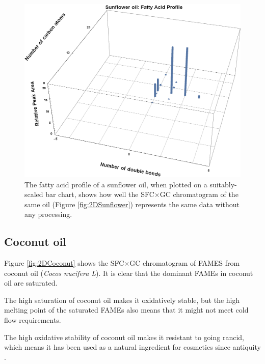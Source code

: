 \begin{figure}
\centering
\includegraphics[width=\textwidth]{Figures/BarChart.png}
\decoRule

\caption[3D Bar chart of fatty acid profile]{The fatty acid profile of a
sunflower oil, when plotted on a suitably-scaled bar chart, shows how well the
SFC×GC chromatogram of the same oil (Figure \ref{fig:2DSunflower}) represents
the same data without any processing.}

\label{fig:2DSunflowerBarChart}
\end{figure}

\subsection{Coconut oil}

Figure \ref{fig:2DCoconut} shows the SFC×GC chromatogram of FAMES from coconut
oil (\textit{Cocos nucifera L}). It is clear that the dominant FAMEs in coconut
oil are saturated.

The high saturation of coconut oil makes it oxidatively stable, but the high
melting point of the saturated FAMEs also means that it might not meet
cold flow requirements.

The high oxidative stability of coconut oil makes it resistant to going rancid,
which means it has been used as a natural ingredient for cosmetics since
antiquity \autocite{Berdick1972}.


